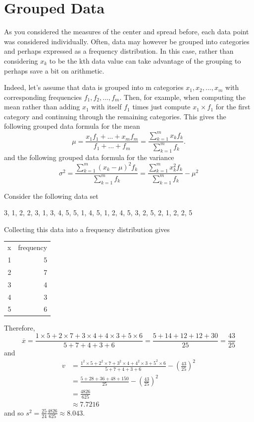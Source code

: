 \documentclass[10pt,]{book}
\theoremstyle{plain}
\theoremstyle{definition}
\theoremstyle{definition}
\numberwithin{equation}{section}
\newcommand{\hrulemedium}{\noalign{\hrule height 0.07em}}
\begin{document}
\section[Grouped Data]{Grouped Data}\label{section-9}
As you considered the measures of the center and spread before, each data point was considered individually. Often, data may however be grouped into categories and perhaps expressed as a frequency distribution. In this case, rather than considering \(x_k\) to be the kth data value can take advantage of the grouping to perhaps save a bit on arithmetic.%
\par
Indeed, let's assume that data is grouped into m categories \(x_1, x_2, ..., x_m\) with corresponding frequencies \(f_1, f_2, ..., f_m\). Then, for example, when computing the mean rather than adding \(x_1\) with itself \(f_1\) times just compute \(x_1 \times f_1\) for the first category and continuing through the remaining categories. This gives the following grouped data formula for the mean
		\begin{equation*}
		\mu = \frac{x_1 f_1 + ... + x_m f_m}{f_1 + ... + f_m} = \frac{\sum_{k=1}^m x_k f_k}{\sum_{k=1}^m f_k}.
		\end{equation*}
and the following grouped data formula for the variance
		\begin{equation*} 
		\sigma^2 = \frac{\sum_{k=1}^m ( x_k-\mu )^2 f_k}{\sum_{k=1}^m f_k} = \frac{\sum_{k=1}^m x_k^2 f_k}{\sum_{k=1}^m f_k} - \mu^2
		\end{equation*}

%
\par

Consider the following data set
%
\par
{3,
1,
2,
2,
3,
1,
3,
4,
5,
5,
1,
4,
5,
1,
2,
4,
5,
3,
2,
5,
2,
1,
2,
2,
5}%
\par

Collecting this data into a frequency distribution gives
\leavevmode%
\begin{table}
\centering
\begin{tabular}{rr}
x&frequency\tabularnewline\hrulemedium
1&5\tabularnewline[0pt]
2&7\tabularnewline[0pt]
3&4\tabularnewline[0pt]
4&3\tabularnewline[0pt]
5&6
\end{tabular}
\end{table}

Therefore, 
	\begin{equation*}
	\overline{x} = \frac{1 \times 5 + 2 \times 7 + 3 \times 4 + 4 \times 3 + 5 \times 6}{5+7+4+3+6} = \frac{5 + 14 + 12 + 12 + 30}{25} = \frac{43}{25}
	\end{equation*}
and 
	\begin{align*}
v & = \frac{1^2 \times 5 + 2^2 \times 7 + 3^2 \times 4 + 4^2 \times 3 + 5^2 \times 6}{5+7+4+3+6} - \left ( \frac{43}{25} \right )^2 \\
 & = \frac{5 + 28 + 36 + 48 + 150}{25} - \left ( \frac{43}{25} \right )^2 \\
 & = \frac{4826}{625}\\
 & \approx 7.7216
\end{align*}
and so \(s^2 = \frac{25}{24} \frac{4826}{625} \approx 8.043\). 
%
\typeout{************************************************}
\typeout{************************************************}
\end{document}
